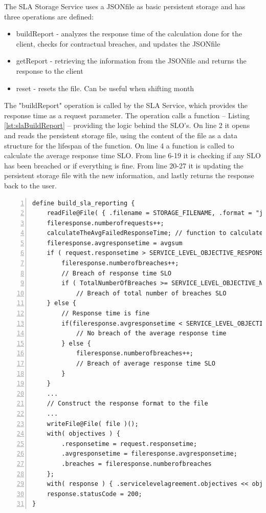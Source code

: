 \documentclass[12pt]{article}
\begin{document}
The SLA Storage Service uses a JSON\-file as basic persistent storage and has three operations are defined:
\begin{itemize}
    \item buildReport - analyzes the response time of the calculation done for the client, checks for contractual breaches, and updates the JSON\-file
    \item getReport - retrieving the information from the JSON\-file and returns the response to the client
    \item reset - resets the file. Can be useful when shifting month
\end{itemize}

The "buildReport" operation is called by the SLA Service, which provides the response time as a request parameter. The operation calls a function -- Listing \ref{lst:slaBuildReport} -- providing the logic behind the SLO's. On line 2 it opens and reads the persistent storage file, using the content of the file as a data structure for the lifespan of the function. On line 4 a function is called to calculate the average response time SLO. From line 6-19 it is checking if any SLO has been breached or if everything is fine. From line 20-27 it is updating the persistent storage file with the new information, and lastly returns the response back to the user. 

\begin{lstlisting}[caption=Updates persistent storage file and checks for contractual breaches, captionpos=b, label={lst:slaBuildReport}, frame=single, breaklines=true, numbers=left, basicstyle=\scriptsize]
define build_sla_reporting {
    readFile@File( { .filename = STORAGE_FILENAME, .format = "json" } )( fileresponse );
    fileresponse.numberofrequests++;
    calculateTheAvgFailedResponseTime; // function to calculate the total average response time 
    fileresponse.avgresponsetime = avgsum
    if ( request.responsetime > SERVICE_LEVEL_OBJECTIVE_RESPONSE_TIME ) {
        fileresponse.numberofbreaches++;
        // Breach of response time SLO
        if ( TotalNumberOfBreaches >= SERVICE_LEVEL_OBJECTIVE_NUMBER_OF_BREACH_RESPONSE_TIMES ) 
            // Breach of total number of breaches SLO
    } else {
        // Response time is fine
        if(fileresponse.avgresponsetime < SERVICE_LEVEL_OBJECTIVE_AVG_RESPONSE_TIME) {
            // No breach of the average response time
        } else {
            fileresponse.numberofbreaches++;
            // Breach of average response time SLO
        }
    }
    ...
    // Construct the response format to the file
    ...
    writeFile@File( file )();
    with( objectives ) {
        .responsetime = request.responsetime;
        .avgresponsetime = fileresponse.avgresponsetime;
        .breaches = fileresponse.numberofbreaches
    };
    with( response ) { .servicelevelagreement.objectives << objectives };
    response.statusCode = 200;
}
\end{lstlisting}
\end{document}
